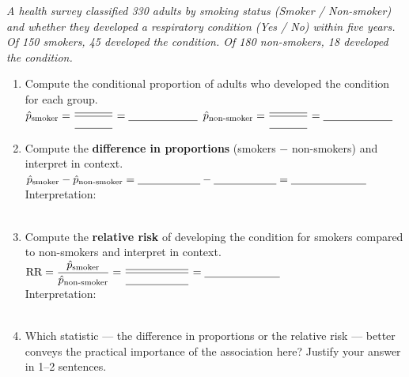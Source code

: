 \documentclass[10pt]{article}
\begin{document}
\namedateperiod

\vspace{0.22in}

\begin{tcolorbox}[colback=sky, colframe=navy, boxrule=0.9pt, arc=2mm,
    left=4mm, right=4mm, top=3mm, bottom=3mm]
\small\textit{A health survey classified 330 adults by smoking status (Smoker / Non-smoker)
and whether they developed a respiratory condition (Yes / No) within five years.
Of 150 smokers, 45 developed the condition. Of 180 non-smokers, 18 developed the condition.}
\end{tcolorbox}

\vspace{0.2in}

\begin{enumerate}[leftmargin=1.6em, itemsep=0.2in]

    \item Compute the conditional proportion of adults who developed the condition for each group.\\[10pt]
          $\hat{p}_{\text{smoker}} = \dfrac{\blank{1.2cm}}{\blank{1.2cm}} = \blank{2.2cm}$
          \hfill
          $\hat{p}_{\text{non-smoker}} = \dfrac{\blank{1.2cm}}{\blank{1.2cm}} = \blank{2.2cm}$

    \item Compute the \textbf{difference in proportions} (smokers $-$ non-smokers) and interpret
          in context.\\[10pt]
          $\hat{p}_{\text{smoker}} - \hat{p}_{\text{non-smoker}} = \blank{2cm} - \blank{2cm} = \blank{2.4cm}$\\[8pt]
          Interpretation:\\[6pt]
          \writeline\\[2pt]\writeline

    \item Compute the \textbf{relative risk} of developing the condition for smokers compared
          to non-smokers and interpret in context.\\[10pt]
          $\text{RR} = \dfrac{\hat{p}_{\text{smoker}}}{\hat{p}_{\text{non-smoker}}}
          = \dfrac{\blank{2cm}}{\blank{2cm}} = \blank{2.4cm}$\\[8pt]
          Interpretation:\\[6pt]
          \writeline\\[2pt]\writeline

    \item Which statistic --- the difference in proportions or the relative risk --- better
          conveys the practical importance of the association here? Justify your answer in
          1--2 sentences.\\[8pt]
          \writeline\\[2pt]\writeline\\[2pt]\writeline

\end{enumerate}
\end{document}
